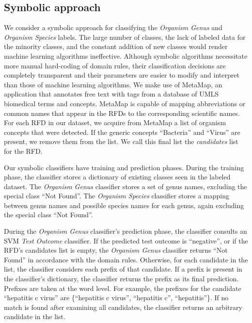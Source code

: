 \documentclass[sigconf]{acmart}
\begin{document}
\subsection{Symbolic approach}

We consider a symbolic approach for classifying the \textit{Organism Genus} and \textit{Organism Species} labels. The large number of classes, the lack of labeled data for the minority classes, and the constant addition of new classes would render machine learning algorithms ineffective. Although symbolic algorithms necessitate more manual hard-coding of domain rules, their classification decisions are completely transparent and their parameters are easier to modify and interpret than those of machine learning algorithms. We make use of MetaMap, an application that annotates free text with tags from a database of UMLS biomedical terms and concepts. MetaMap is capable of mapping abbreviations or common names that appear in the RFDs to the corresponding scientific names. For each RFD in our dataset, we acquire from MetaMap a list of organism concepts that were detected. If the generic concepts ``Bacteria'' and ``Virus'' are present, we remove them from the list. We call this final list the \textit{candidates} list for the RFD.

Our symbolic classifiers have training and prediction phases. During the training phase, the classifier stores a dictionary of existing classes seen in the labeled dataset. The \textit{Organism Genus} classifier stores a set of genus names, excluding the special class ``Not Found''. The \textit{Organism Species} classifier stores a mapping between genus names and possible species names for each genus, again excluding the special class ``Not Found''.

During the \textit{Organism Genus} classifier's prediction phase, the classifier consults an SVM \textit{Test Outcome} classifier. If the predicted test outcome is ``negative'', or if the RFD's candidates list is empty, the \textit{Organism Genus} classifier returns ``Not Found'' in accordance with the domain rules. Otherwise, for each candidate in the list, the classifier considers each prefix of that candidate. If a prefix is present in the classifier's dictionary, the classifier returns the prefix as its final prediction. Prefixes are taken at the word level. For example, the prefixes for the candidate ``hepatitis c virus'' are \{``hepatitis c virus'', ``hepatitis c'', ``hepatitis''\}. If no match is found after examining all candidates, the classifier returns an arbitrary candidate in the list.
\end{document}
